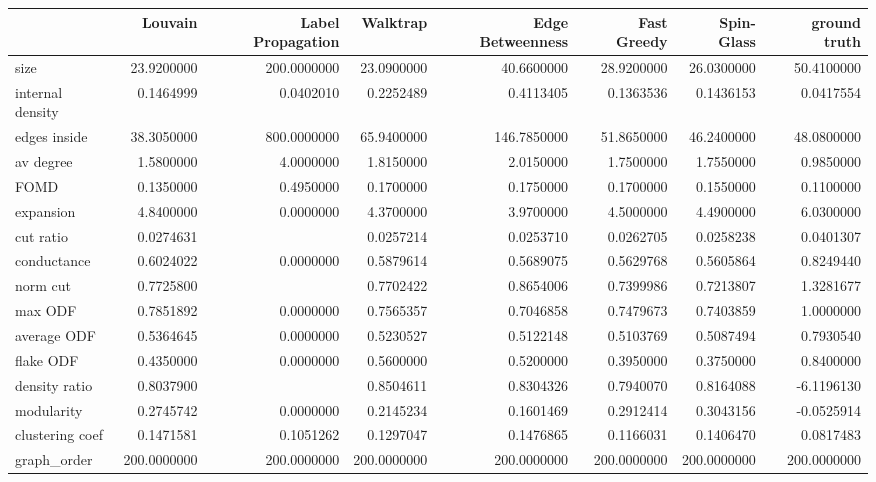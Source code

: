 \begin{table}[ht]
\centering
\begin{tabular}{lrrrrrrr}
  \hline
 & Louvain & Label Propagation & Walktrap & Edge Betweenness & Fast Greedy & Spin-Glass & ground truth \\ 
  \hline
size & 23.9200000 & 200.0000000 & 23.0900000 & 40.6600000 & 28.9200000 & 26.0300000 & 50.4100000 \\ 
  internal density & 0.1464999 & 0.0402010 & 0.2252489 & 0.4113405 & 0.1363536 & 0.1436153 & 0.0417554 \\ 
  edges inside & 38.3050000 & 800.0000000 & 65.9400000 & 146.7850000 & 51.8650000 & 46.2400000 & 48.0800000 \\ 
  av degree & 1.5800000 & 4.0000000 & 1.8150000 & 2.0150000 & 1.7500000 & 1.7550000 & 0.9850000 \\ 
  FOMD & 0.1350000 & 0.4950000 & 0.1700000 & 0.1750000 & 0.1700000 & 0.1550000 & 0.1100000 \\ 
  expansion & 4.8400000 & 0.0000000 & 4.3700000 & 3.9700000 & 4.5000000 & 4.4900000 & 6.0300000 \\ 
  cut ratio & 0.0274631 &  & 0.0257214 & 0.0253710 & 0.0262705 & 0.0258238 & 0.0401307 \\ 
  conductance & 0.6024022 & 0.0000000 & 0.5879614 & 0.5689075 & 0.5629768 & 0.5605864 & 0.8249440 \\ 
  norm cut & 0.7725800 &  & 0.7702422 & 0.8654006 & 0.7399986 & 0.7213807 & 1.3281677 \\ 
  max ODF & 0.7851892 & 0.0000000 & 0.7565357 & 0.7046858 & 0.7479673 & 0.7403859 & 1.0000000 \\ 
  average ODF & 0.5364645 & 0.0000000 & 0.5230527 & 0.5122148 & 0.5103769 & 0.5087494 & 0.7930540 \\ 
  flake ODF & 0.4350000 & 0.0000000 & 0.5600000 & 0.5200000 & 0.3950000 & 0.3750000 & 0.8400000 \\ 
  density ratio & 0.8037900 &  & 0.8504611 & 0.8304326 & 0.7940070 & 0.8164088 & -6.1196130 \\ 
  modularity & 0.2745742 & 0.0000000 & 0.2145234 & 0.1601469 & 0.2912414 & 0.3043156 & -0.0525914 \\ 
  clustering coef & 0.1471581 & 0.1051262 & 0.1297047 & 0.1476865 & 0.1166031 & 0.1406470 & 0.0817483 \\ 
  graph\_order & 200.0000000 & 200.0000000 & 200.0000000 & 200.0000000 & 200.0000000 & 200.0000000 & 200.0000000 \\ 

\end{tabular}
\end{table}
